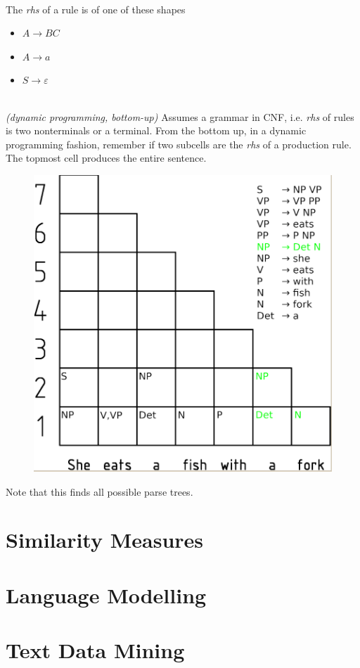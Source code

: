 \documentclass[10pt,twocolumn]{article}
\begin{document}
\paragraph{} The \textit{rhs} of a rule is of one of
these shapes
\begin{itemize}
\item $A \rightarrow BC$
\item $A \rightarrow a$
\item $S \rightarrow \varepsilon$
\end{itemize}


\paragraph{ } \textit{(dynamic programming, bottom-up)} Assumes
a grammar in CNF, i.e. \textit{rhs} of rules is two nonterminals or a terminal.
From the bottom up, in a dynamic programming fashion, remember if two subcells
are the \textit{rhs} of a production rule. The topmost cell produces the entire sentence.
\begin{figure}
  \centering
  \includegraphics[width=0.4\linewidth]{cyk-parsing}
\end{figure}
Note that this finds all possible parse trees.



\pagebreak
\part{Similarity Measures}

\pagebreak
\part{Language Modelling}

\pagebreak
\part{Text Data Mining}
\end{document}
